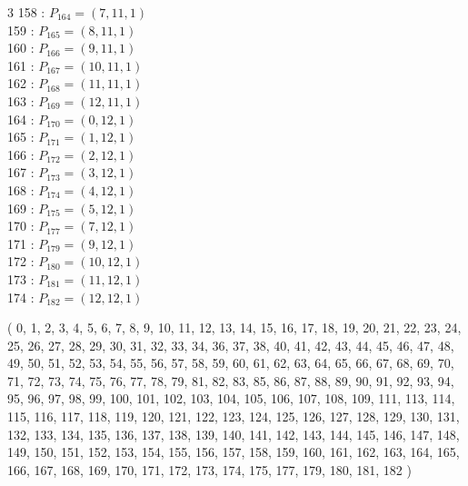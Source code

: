 \documentclass{article}
\begin{document}
{\begin{multicols}{3}
158 : $P_{164}=( 7, 11, 1 )$\\
159 : $P_{165}=( 8, 11, 1 )$\\
160 : $P_{166}=( 9, 11, 1 )$\\
161 : $P_{167}=( 10, 11, 1 )$\\
162 : $P_{168}=( 11, 11, 1 )$\\
163 : $P_{169}=( 12, 11, 1 )$\\
164 : $P_{170}=( 0, 12, 1 )$\\
165 : $P_{171}=( 1, 12, 1 )$\\
166 : $P_{172}=( 2, 12, 1 )$\\
167 : $P_{173}=( 3, 12, 1 )$\\
168 : $P_{174}=( 4, 12, 1 )$\\
169 : $P_{175}=( 5, 12, 1 )$\\
170 : $P_{177}=( 7, 12, 1 )$\\
171 : $P_{179}=( 9, 12, 1 )$\\
172 : $P_{180}=( 10, 12, 1 )$\\
173 : $P_{181}=( 11, 12, 1 )$\\
174 : $P_{182}=( 12, 12, 1 )$\\
\end{multicols}
( 0, 1, 2, 3, 4, 5, 6, 7, 8, 9, 10, 11, 12, 13, 14, 15, 16, 17, 18, 19, 20, 21, 22, 23, 24, 25, 26, 27, 28, 29, 30, 31, 32, 33, 34, 36, 37, 38, 40, 41, 42, 43, 44, 45, 46, 47, 48, 49, 50, 51, 52, 53, 54, 55, 56, 57, 58, 59, 60, 61, 62, 63, 64, 65, 66, 67, 68, 69, 70, 71, 72, 73, 74, 75, 76, 77, 78, 79, 81, 82, 83, 85, 86, 87, 88, 89, 90, 91, 92, 93, 94, 95, 96, 97, 98, 99, 100, 101, 102, 103, 104, 105, 106, 107, 108, 109, 111, 113, 114, 115, 116, 117, 118, 119, 120, 121, 122, 123, 124, 125, 126, 127, 128, 129, 130, 131, 132, 133, 134, 135, 136, 137, 138, 139, 140, 141, 142, 143, 144, 145, 146, 147, 148, 149, 150, 151, 152, 153, 154, 155, 156, 157, 158, 159, 160, 161, 162, 163, 164, 165, 166, 167, 168, 169, 170, 171, 172, 173, 174, 175, 177, 179, 180, 181, 182 )\\
}
\end{document}
